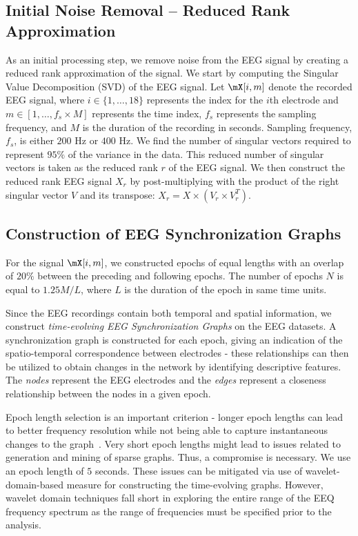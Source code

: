 \documentclass{article} %
\begin{document}
\subsection{Initial Noise Removal -- Reduced Rank Approximation}
As an initial processing step, we remove noise from the EEG signal by creating a reduced rank approximation of the signal.  We start by computing the Singular Value Decomposition (SVD) of the EEG signal.  Let $\mX[i,m]$ denote the recorded EEG signal, where $i\in\{1,\ldots,18\}$ represents the index for the $i$th electrode and $m\in\left[1,\ldots,f_s\times M\right]$ represents the time index, $f_s$ represents the sampling frequency, and $M$ is the duration of the recording in seconds.  Sampling frequency, $f_s$, is either $200$ Hz or $400$ Hz.  We find the number of singular vectors required to represent $95\%$ of the variance in the data.  This reduced number of singular vectors is taken as the reduced rank $r$ of the EEG signal.  We then construct the reduced rank EEG signal $X_r$ by post-multiplying with the product of the right singular vector $V$ and its transpose: $X_r = X\times(V_r \times V_r^T)$.

\subsection{Construction of EEG Synchronization Graphs} \label{sec:graph_construct}
For the signal $\mX[i,m]$, we constructed epochs of equal lengths with an overlap of $20\%$ between the  preceding and following epochs.  The number of epochs $N$ is equal to $1.25M/L$, where $L$ is the duration of the epoch in same time units.

Since the EEG recordings contain both temporal and spatial information, we construct {\em time-evolving EEG Synchronization Graphs} on the EEG datasets.  A synchronization graph is constructed for each epoch, giving an indication of the spatio-temporal correspondence between electrodes - these relationships can then be utilized to obtain changes in the network by identifying descriptive features.  The {\em nodes} represent the EEG electrodes and the {\em edges} represent a closeness relationship between the nodes in a given epoch.

Epoch length selection is an important criterion - longer epoch lengths can lead to better frequency resolution while not being able to capture instantaneous changes to the graph~\cite{vandeVelde:eeg_recordings,Levy:eeg_pow_spect_1986,Levy:eeg_pow_spect_1987}.  Very short epoch lengths might lead to issues related to generation and mining of sparse graphs.  Thus, a compromise is necessary.  We use an epoch length of $5$ seconds.  These issues can be mitigated via use of wavelet-domain-based measure for constructing the time-evolving graphs.  However, wavelet domain techniques fall short in exploring the entire range of the EEQ frequency spectrum as the range of frequencies must be specified prior to the analysis.
\end{document}
